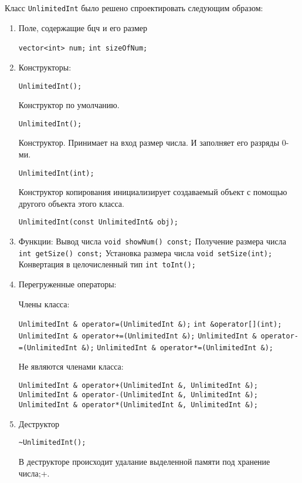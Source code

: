 \documentclass[12pt,a4paper]{report}
\begin{document}
Класс \verb+UnlimitedInt+ было решено спроектировать следующим образом: 
\begin{enumerate}
 	\item Поле, содержащие бцч и его размер
 	
 	\verb+vector<int> num;+
    \verb+int sizeOfNum;+	
		 
	\item Конструкторы:
	
	\verb+UnlimitedInt();+

	Конструктор по умолчанию.
	
	\verb+UnlimitedInt();+
	
	Конструктор. Принимает на вход размер числа. И заполняет его разряды 0-ми.
	
	\verb+UnlimitedInt(int);+

	Конструктор копирования инициализирует создаваемый объект с помощью другого объекта этого класса.
	
	\verb+UnlimitedInt(const UnlimitedInt& obj);+
	
	\item Функции:
	Вывод числа
	\verb+void showNum() const;+
	Получение размера числа
    \verb+int getSize() const;+
    Установка размера числа
    \verb+void setSize(int);+
    Конвертация в целочисленный тип
    \verb+int toInt();+
	
	\item Перегруженные операторы:
	
	Члены класса:
	
	
	\verb+UnlimitedInt & operator=(UnlimitedInt &);+
    \verb+int &operator[](int);+
    \verb-UnlimitedInt & operator+=(UnlimitedInt &);-
    \verb+UnlimitedInt & operator-=(UnlimitedInt &);+
    \verb+UnlimitedInt & operator*=(UnlimitedInt &);+
    
    Не являются членами класса:
    
    \verb-UnlimitedInt & operator+(UnlimitedInt &, UnlimitedInt &);-
	\verb+UnlimitedInt & operator-(UnlimitedInt &, UnlimitedInt &);+
	\verb+UnlimitedInt & operator*(UnlimitedInt &, UnlimitedInt &);+
	
	\item Деструктор	
	
	\verb+~UnlimitedInt();+
	
	В деструкторе происходит удалание выделенной памяти под хранение числа;+.
	
\end{enumerate}
\end{document}
